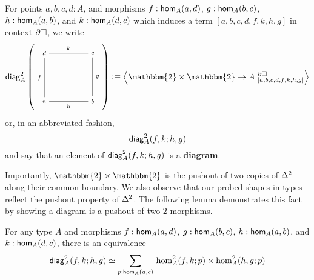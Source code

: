 \documentclass[main.tex]{subfiles}
\begin{document}
\begin{definition}
    For points $a,b,c,d : A$, and morphisms $f : \ho[A]{a}{d}$, $g : \ho[A]{b}{c}$, $h : \ho[A]{a}{b}$, and $k : \ho[A]{d}{c}$ which induces a term \linebreak $[a,b,c,d,f,k,h,g]$ in context $\pards$, we write
    $$\diag{A}(a,b,c,d,f,k,h,g) \defeq \ndexten{\mathbbm{2}\times\mathbbm{2}}{A}{\pards}{[a,b,c,d,f,k,h,g]}$$
    or, in an abbreviated fashion,
    $$\diagshort{A}(a,b,c,d,f,k,h,g)$$
    and say that an element of $\diagshort{A}(a,b,c,d,f,k,h,g)$ is a \textbf{diagram}.
\end{definition}
Importantly, $\mathbbm{2} \times \mathbbm{2}$ is the pushout of two copies of $\tsx$ along their common boundary.
We also observe that our probed shapes in types reflect the pushout property of $\tsx$. The following lemma demonstrates this fact by showing a diagram is a pushout of two $2$-morphisms.
\begin{lemma}
    \label{lem:squareistwotriangles}
    For any type $A$ and morphisms $f : \ho[A]{a}{d}$, $g : \ho[A]{b}{c}$, $h : \ho[A]{a}{b}$, and $k : \ho[A]{d}{c}$, there is an equivalence 
    \begin{equation}
        \label{eqn:squareistwotriangles}
        \diagshort{A}(a,b,c,d,f,k,h,g) \simeq \sm{p : \ho[A]{a}{c}}\homtwoshort{A}(a,d,c,f,k,p) \times \homtwoshort{A}(a,b,c,h,g,p) 
    \end{equation} 
\end{lemma}
\end{document}
